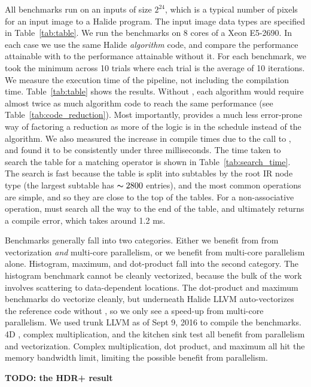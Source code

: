 All benchmarks run on an inputs of size $2^{24}$, which is a typical number of pixels for an input image to a Halide program. The input image data types are specified in Table~\ref{tab:table}. We run the benchmarks on 8 cores of a Xeon E5-2690. In each case we use the same Halide \emph{algorithm} code, and compare the performance attainable with  to the performance attainable without it. For each benchmark, we took the minimum across 10 trials where each trial is the average of 10 iterations. We measure the execution time of the pipeline, not including the compilation time. Table~\ref{tab:table} shows the results. Without , each algorithm would require almost twice as much algorithm code to reach the same performance (see Table~\ref{tab:code_reduction}). Most importantly,  provides a much less error-prone way of factoring a reduction as more of the logic is in the schedule instead of the algorithm. We also measured the increase in compile times due to the call to , and found it to be consistently under three milliseconds. The time taken to search the table for a matching operator is shown in Table~\ref{tab:search_time}. The search is fast because the table is split into subtables by the root IR node type (the largest subtable has $\thicksim 2800$ entries), and the most common operations are simple, and so they are close to the top of the tables. For a non-associative operation,  must search all the way to the end of the table, and ultimately returns a compile error, which takes around 1.2 ms.

Benchmarks generally fall into two categories. Either we benefit from from vectorization \emph{and} multi-core parallelism, or we benefit from multi-core parallelism alone. Histogram, maximum, and dot-product fall into the second category. The histogram benchmark cannot be cleanly vectorized, because the bulk of the work involves scattering to data-dependent locations. The dot-product and maximum benchmarks do vectorize cleanly, but underneath Halide LLVM auto-vectorizes the reference code without , so we only see a speed-up from multi-core parallelism. We used trunk LLVM as of Sept 9, 2016 to compile the benchmarks. 4D , complex multiplication, and the kitchen sink test all benefit from parallelism and vectorization. Complex multiplication, dot product, and maximum all hit the memory bandwidth limit, limiting the possible benefit from parallelism.

\textbf{TODO: the HDR+ result}

